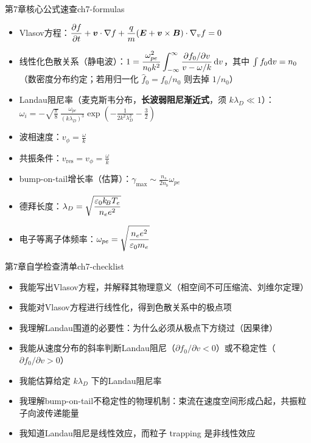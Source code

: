 \begin{formulabox}{第7章核心公式速查}{ch7-formulas}
\begin{itemize}[leftmargin=*,itemsep=0pt]
\item Vlasov方程：$\displaystyle\frac{\partial f}{\partial t} + \bm{v}\cdot\nabla f + \frac{q}{m}(\bm{E} + \bm{v}\times\bm{B})\cdot\nabla_v f = 0$
\item 线性化色散关系（静电波）：$\displaystyle 1 = \frac{\omega_{pe}^2}{n_0k^2}\int_{-\infty}^{\infty} \frac{\partial f_0/\partial v}{v - \omega/k}\,\mathrm{d} v$，其中 $\int f_0\mathrm{d} v=n_0$（数密度分布约定；若用归一化 $\hat f_0=f_0/n_0$ 则去掉 $1/n_0$）
\item Landau阻尼率（麦克斯韦分布，\textbf{长波弱阻尼渐近式}，须 $k\lambda_D\ll1$）：$\displaystyle\omega_i = -\sqrt{\frac{\pi}{8}}\,\frac{\omega_{pe}}{(k\lambda_D)^3}\exp\!\left(-\frac{1}{2k^2\lambda_D^2} - \frac{3}{2}\right)$
\item 波相速度：$\displaystyle v_\phi = \frac{\omega}{k}$
\item 共振条件：$\displaystyle v_{\text{res}} = v_\phi = \frac{\omega}{k}$
\item bump-on-tail增长率（估算）：$\displaystyle\gamma_{\max} \sim \frac{n_s}{2n_b}\omega_{pe}$
\item 德拜长度：$\displaystyle\lambda_D = \sqrt{\frac{\varepsilon_0 k_{\!B}T_e}{n_e e^2}}$
\item 电子等离子体频率：$\displaystyle\omega_{pe} = \sqrt{\frac{n_e e^2}{\varepsilon_0 m_e}}$
\end{itemize}
\end{formulabox}

\begin{checklistbox}{第7章自学检查清单}{ch7-checklist}
\begin{itemize}[leftmargin=*,label=$\square$]
\item 我能写出Vlasov方程，并解释其物理意义（相空间不可压缩流、刘维尔定理）
\item 我能对Vlasov方程进行线性化，得到色散关系中的极点项
\item 我理解Landau围道的必要性：为什么必须从极点下方绕过（因果律）
\item 我能从速度分布的斜率判断Landau阻尼（$\partial f_0/\partial v < 0$）或不稳定性（$\partial f_0/\partial v > 0$）
\item 我能估算给定 $k\lambda_D$ 下的Landau阻尼率
\item 我理解bump-on-tail不稳定性的物理机制：束流在速度空间形成凸起，共振粒子向波传递能量
\item 我知道Landau阻尼是线性效应，而粒子 trapping 是非线性效应
\end{itemize}
\end{checklistbox}

\endinput

